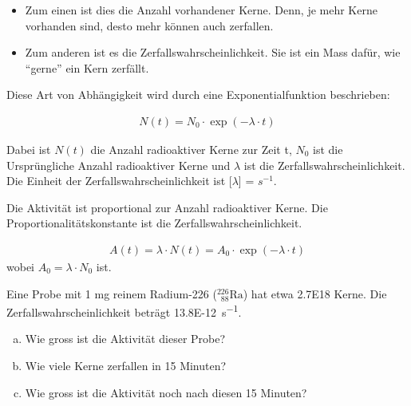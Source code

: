 \documentclass[12pt,a4paper,twoside]{article}
\newcommand{\Kern}[3]{$^{#1}_{\phantom{1}#2}\text{#3}$}
\begin{document}
\begin{itemize}
	\item Zum einen ist dies die Anzahl vorhandener Kerne. Denn, je mehr Kerne vorhanden sind, desto mehr können auch zerfallen.
	\item Zum anderen ist es die Zerfallswahrscheinlichkeit. Sie ist ein Mass dafür, wie ``gerne'' ein Kern zerfällt.
\end{itemize}


Diese Art von Abhängigkeit wird durch eine Exponentialfunktion beschrieben:

\begin{eqnarray*}
	N(t)=N_0\cdot\exp{(-\lambda\cdot t)}
\end{eqnarray*}

Dabei ist $N(t)$ die Anzahl radioaktiver Kerne zur Zeit t,
$N_0$ ist die Ursprüngliche Anzahl radioaktiver Kerne und
$\lambda$ ist die Zerfallswahrscheinlichkeit. Die Einheit der Zerfallswahrscheinlichkeit ist [$\lambda$] = $s^{-1}$.

Die Aktivität ist proportional zur Anzahl radioaktiver Kerne. Die Proportionalitätskonstante ist die Zerfallswahrscheinlichkeit.

\begin{eqnarray*}
	A(t) = \lambda\cdot N(t)=A_0\cdot \exp{(-\lambda\cdot t)}
\end{eqnarray*}
wobei $A_0= \lambda\cdot N_0$ ist.

\begin{aufgabe}
	
	Eine Probe mit 1 mg reinem Radium-226 (\Kern{226}{88}{Ra}) hat etwa \num{2.7E18} Kerne. 
	Die Zerfallswahrscheinlichkeit beträgt \SI{13.8E-12}{s^{-1}}.

	\begin{enumerate}[a)]
		\item Wie gross ist die Aktivität dieser Probe?
		\item Wie viele Kerne zerfallen in 15 Minuten?
		\item Wie gross ist die Aktivität noch nach diesen 15 Minuten?
	\end{enumerate}

\end{aufgabe}
\end{document}
